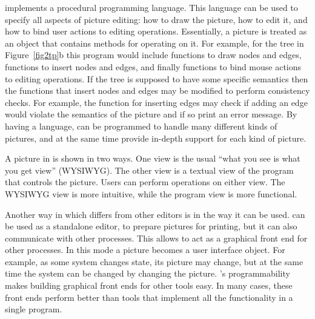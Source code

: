 {\LEFTY} implements a procedural programming language. This language can be
used to specify all aspects of picture editing: how to draw the picture, how to
edit it, and how to bind user actions to editing operations. Essentially, a
picture is treated as an object that contains methods for operating on it. For
example, for the tree in Figure~\ref{fig2tp}b this program would include
functions to draw nodes and edges, functions to insert nodes and edges, and
finally functions to bind mouse actions to editing operations. If the tree is
supposed to have some specific semantics then the functions that insert nodes
and edges may be modified to perform consistency checks. For example, the
function for inserting edges may check if adding an edge would violate the
semantics of the picture and if so print an error message. By having a
language, {\LEFTY} can be programmed to handle many different kinds of
pictures, and at the same time provide in-depth support for each kind of
picture.

A picture in {\LEFTY} is shown in two ways. One view is the usual ``what you
see is what you get view'' (WYSIWYG). The other view is a textual view of the
program that controls the picture. Users can perform operations on either view.
The WYSIWYG view is more intuitive, while the program view is more functional.

Another way in which {\LEFTY} differs from other editors is in the way it can
be used. {\LEFTY} can be used as a standalone editor, to prepare pictures for
printing, but it can also communicate with other processes. This allows
{\LEFTY} to act as a graphical front end for other processes. In this mode a
picture becomes a user interface object. For example, as some system changes
state, its picture may change, but at the same time the system can be changed
by changing the picture. {\LEFTY}'s programmability makes building graphical
front ends for other tools easy. In many cases, these front ends perform better
than tools that implement all the functionality in a single program.
